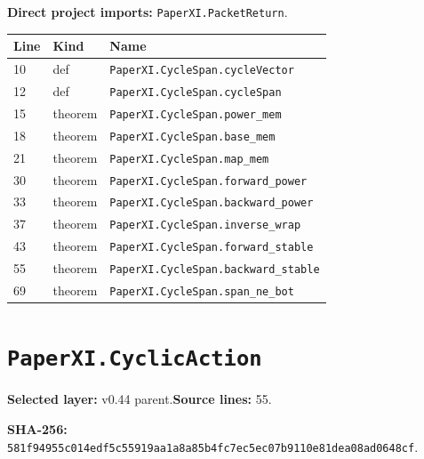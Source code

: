 \documentclass[10pt,oneside]{book}
\begin{document}

\textbf{Direct project imports:} \nolinkurl{PaperXI.PacketReturn}.

\begin{longtable}{@{}p{}p{}p{}@{}}\toprule Line&Kind&Name\\\midrule\endhead

10&def&\nolinkurl{PaperXI.CycleSpan.cycleVector}\\

12&def&\nolinkurl{PaperXI.CycleSpan.cycleSpan}\\

15&theorem&\nolinkurl{PaperXI.CycleSpan.power_mem}\\

18&theorem&\nolinkurl{PaperXI.CycleSpan.base_mem}\\

21&theorem&\nolinkurl{PaperXI.CycleSpan.map_mem}\\

30&theorem&\nolinkurl{PaperXI.CycleSpan.forward_power}\\

33&theorem&\nolinkurl{PaperXI.CycleSpan.backward_power}\\

37&theorem&\nolinkurl{PaperXI.CycleSpan.inverse_wrap}\\

43&theorem&\nolinkurl{PaperXI.CycleSpan.forward_stable}\\

55&theorem&\nolinkurl{PaperXI.CycleSpan.backward_stable}\\

69&theorem&\nolinkurl{PaperXI.CycleSpan.span_ne_bot}\\

\bottomrule\end{longtable}

\section{\texorpdfstring{\nolinkurl{PaperXI.CyclicAction}}{PaperXI.CyclicAction}}\label{module:PaperXI.CyclicAction}

\textbf{Selected layer:} v0.44 parent.\quad\textbf{Source lines:} 55.\par\textbf{SHA-256:} {\scriptsize\nolinkurl{581f94955c014edf5c55919aa1a8a85b4fc7ec5ec07b9110e81dea08ad0648cf}}.
\end{document}
